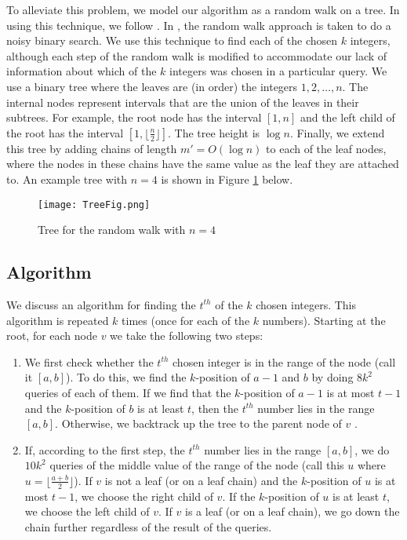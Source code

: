 \documentclass[12pt]{article}
\begin{document}
To alleviate this problem, we model our algorithm as a random walk on a tree. In using this technique, we follow \cite{Feige}. In \cite{Feige}, the random walk approach is taken to do a noisy binary search. We use this technique to find each of the chosen $k$ integers, although each step of the random walk is modified to accommodate our lack of information about which of the $k$ integers was chosen in a particular query. We use a binary tree where the leaves are (in order) the integers $1, 2, \ldots, n$. The internal nodes represent intervals that are the union of the leaves in their subtrees. For example, the root node has the interval $[1, n]$ and the left child of the root has the interval $[1, \lfloor\frac{n}{2}\rfloor]$. The tree height is $\log{n}$. Finally, we extend this tree by adding chains of length $m' = O(\log{n})$ to each of the leaf nodes, where the nodes in these chains have the same value as the leaf they are attached to. An example tree with $n = 4$ is shown in Figure \ref{fig:treefig} below.

\begin{figure}[ht]
	\centering
		\texttt{[image: TreeFig.png]}
	\caption{Tree for the random walk with $n = 4$}
	\label{fig:treefig}
\end{figure} 

\subsection{Algorithm} \label{subsec:algdetails}

We discuss an algorithm for finding the $t^{th}$ of the $k$ chosen integers. This algorithm is repeated $k$ times (once for each of the $k$ numbers). Starting at the root, for each node $v$ we take the following two steps:
\begin{enumerate}
	\item We first check whether the $t^{th}$ chosen integer is in the range of the node (call it $[a, b]$). To do this, we find the $k$-position of $a-1$ and $b$ by doing $8k^2$ queries of each of them. If we find that the $k$-position of $a-1$ is at most $t-1$ and the $k$-position of $b$ is at least $t$, then the $t^{th}$ number lies in the range $[a, b]$. Otherwise, we backtrack up the tree to the parent node of $v$ . 
	\item If, according to the first step, the $t^{th}$ number lies in the range $[a, b]$, we do $10k^2$ queries of the middle value of the range of the node (call this $u$ where $u = \lfloor\frac{a+b}{2}\rfloor$). If $v$ is not a leaf (or on a leaf chain) and the $k$-position of $u$ is at most $t-1$, we choose the right child of $v$. If the $k$-position of $u$ is at least $t$, we choose the left child of $v$. If $v$ is a leaf (or on a leaf chain), we go down the chain further regardless of the result of the queries. 
\end{enumerate}
\end{document}

